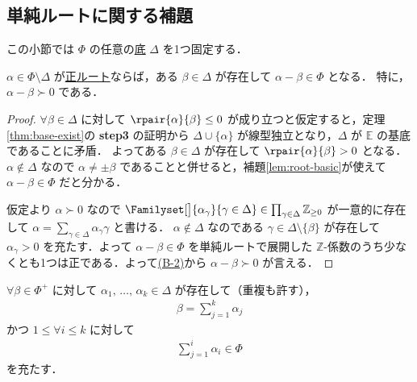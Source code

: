 \documentclass[rep_main]{subfiles}
\begin{document}
\subsection{単純ルートに関する補題}

この小節では $\Phi$ の任意の\hyperref[def:base-root]{底} $\Delta$ を1つ固定する．

\begin{mylem}[label=lem:simpleroot-A]{}
	$\alpha \in \Phi \setminus \Delta$ が\hyperref[def:base-root]{正ルート}ならば，ある $\beta \in \Delta$ が存在して $\alpha - \beta \in \Phi$ となる．
	特に，$\alpha - \beta \succ 0$ である．
\end{mylem}

\begin{proof}
	$\forall \beta \in \Delta$ に対して $\rpair{\alpha}{\beta} \le 0$ が成り立つと仮定すると，定理\ref{thm:base-exist}の \textsf{\textbf{step3}} の証明から $\Delta \cup \{\alpha\}$ が線型独立となり，$\Delta$ が $\mathbb{E}$ の基底であることに矛盾．
	よってある $\beta \in \Delta$ が存在して $\rpair{\alpha}{\beta} > 0$ となる．$\alpha \notin \Delta$ なので $\alpha \neq \pm \beta$ であることと併せると，補題\ref{lem:root-basic}が使えて $\alpha - \beta \in \Phi$ だと分かる．

	仮定より $\alpha \succ 0$ なので $\Familyset[\big]{\alpha_\gamma}{\gamma \in \Delta} \in \prod_{\gamma \in \Delta} \mathbb{Z}_{\ge 0}$ が一意的に存在して $\alpha = \sum_{\gamma \in \Delta} \alpha_\gamma \gamma$ と書ける．
	$\alpha \notin \Delta$ なのである $\gamma \in \Delta \setminus \{\beta\}$ が存在して $\alpha_\gamma > 0$ を充たす．よって $\alpha - \beta \in \Phi$ を単純ルートで展開した $\mathbb{Z}$-係数のうち少なくとも1つは正である．よって\hyperref[def:base-root]{(B-2)}から $\alpha - \beta \succ 0$ が言える．
\end{proof}


\begin{mycol}[label=col:simpleroot-A]{}
	$\forall \beta \in \Phi^+$ に対して $\alpha_1,\, \dots,\, \alpha_k \in \Delta$ が存在して（重複も許す），
	\begin{align}
		\beta = \sum_{j=1}^k \alpha_j
	\end{align}
	かつ $1 \le \forall i \le k$ に対して 
	\begin{align}
		\sum_{j=1}^i \alpha_i \in \Phi
	\end{align}
	を充たす．
\end{mycol}
\end{document}
